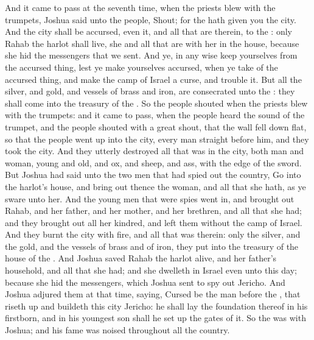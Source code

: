 \begin{biblechapter}
\verse And it came to pass at the seventh time, when the priests blew with the trumpets, Joshua said unto the people, Shout; for the \LORD hath given you the city.
\verse And the city shall be accursed, even it, and all that are therein, to the \LORD: only Rahab the harlot shall live, she and all that are with her in the house, because she hid the messengers that we sent.
\verse And ye, in any wise keep yourselves from the accursed thing, lest ye make yourselves accursed, when ye take of the accursed thing, and make the camp of Israel a curse, and trouble it.
\verse But all the silver, and gold, and vessels of brass and iron, are consecrated unto the \LORD: they shall come into the treasury of the \LORD.
\verse So the people shouted when the priests blew with the trumpets: and it came to pass, when the people heard the sound of the trumpet, and the people shouted with a great shout, that the wall fell down flat, so that the people went up into the city, every man straight before him, and they took the city.
\verse And they utterly destroyed all that was in the city, both man and woman, young and old, and ox, and sheep, and ass, with the edge of the sword.
\verse But Joshua had said unto the two men that had spied out the country, Go into the harlot's house, and bring out thence the woman, and all that she hath, as ye sware unto her.
\verse And the young men that were spies went in, and brought out Rahab, and her father, and her mother, and her brethren, and all that she had; and they brought out all her kindred, and left them without the camp of Israel.
\verse And they burnt the city with fire, and all that was therein: only the silver, and the gold, and the vessels of brass and of iron, they put into the treasury of the house of the \LORD.
\verse And Joshua saved Rahab the harlot alive, and her father's household, and all that she had; and she dwelleth in Israel even unto this day; because she hid the messengers, which Joshua sent to spy out Jericho.
\verse And Joshua adjured them at that time, saying, Cursed be the man before the \LORD, that riseth up and buildeth this city Jericho: he shall lay the foundation thereof in his firstborn, and in his youngest son shall he set up the gates of it.
\verse So the \LORD was with Joshua; and his fame was noised throughout all the country.
\end{biblechapter}

